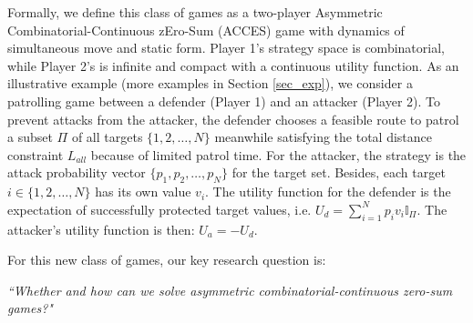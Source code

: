 Formally, we define this class of games as a two-player Asymmetric Combinatorial-Continuous zEro-Sum (ACCES) game with dynamics of simultaneous move and static form. Player 1’s strategy space is combinatorial, while Player 2’s is infinite and compact with a continuous utility function. As an illustrative example (more examples in Section \ref{sec_exp}), we consider a patrolling game between a defender (Player 1) and an attacker (Player 2). To prevent attacks from the attacker, the defender chooses a feasible route to patrol a subset $\Pi$ of all targets $\{1, 2, …, N\}$ meanwhile satisfying the total distance constraint $L_{all}$ because of limited patrol time. For the attacker, the strategy is the attack probability vector $\{p_1, p_2, …, p_N\}$ for the target set. Besides, each target $i \in \{1, 2, …, N\}$ has its own value $v_i$. The utility function for the defender is the expectation of successfully protected target values, i.e. $ U_d = \sum_{i=1}^N p_i v_i \mathbb{I}_{\Pi}$. The attacker’s utility function is then: $U_a = - U_d$.



For this new class of games, our key research question is:

\textit{``Whether and how can we solve asymmetric combinatorial-continuous zero-sum games?"}

